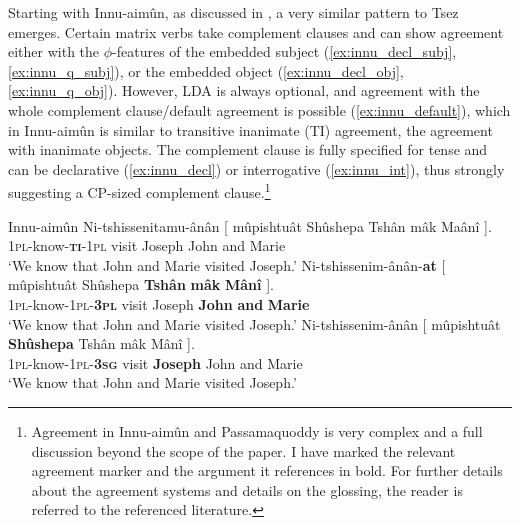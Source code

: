 \documentclass[output=paper
,modfonts
,nonflat]{langsci/langscibook}
\begin{document}
Starting with Innu-aim\^{u}n, as discussed in \citet{Branigan_MacKenzie2002}, a very similar pattern to Tsez emerges. Certain matrix verbs take complement clauses and can show agreement either with the $ \phi $-features of the embedded subject (\ref{ex:innu_decl_subj}, \ref{ex:innu_q_subj}), or the embedded object (\ref{ex:innu_decl_obj}, \ref{ex:innu_q_obj}). However, LDA is always optional, and agreement with the whole complement clause/default agreement is possible (\ref{ex:innu_default}), which in Innu-aim\^{u}n is similar to transitive inanimate (TI) agreement, the agreement with inanimate objects. The complement clause is fully specified for tense and can be declarative (\ref{ex:innu_decl}) or interrogative (\ref{ex:innu_int}), thus strongly suggesting a CP-sized complement clause.{\footnote{Agreement in Innu-aim\^{u}n and Passamaquoddy is very complex and a full discussion beyond the scope of the paper. I have marked the relevant agreement marker and the argument it references in bold. For further details about the agreement systems and details on the glossing, the reader is referred to the referenced literature.}} %
\begin{exe}
\ex Innu-aim\^{u}n \citep[][388]{Branigan_MacKenzie2002} \label{ex:innu_decl}
	\xlist
	\ex \label{ex:innu_default}
		\gll Ni-tshissenitamu-\^{a}n\^{a}n [ m\^{u}pishtu\^{a}t Sh\^{u}shepa Tsh\^{a}n m\^{a}k Ma\^{a}n\^{i} ].\\
			 \textsc{1pl}-know-\textsc{\textbf{ti}-1pl} {} visit Joseph John and Marie\\
		\glt `We know that John and Marie visited Joseph.'
	\ex \label{ex:innu_decl_subj}
		\gll Ni-tshissenim-\^{a}n\^{a}n-\textbf{at} [ m\^{u}pishtu\^{a}t Sh\^{u}shepa \textbf{Tsh\^{a}n} \textbf{m\^{a}k} \textbf{M\^{a}n\^{i}} ].\\
			 \textsc{1pl}-know-\textsc{1pl-\textbf{3pl}} {} visit Joseph \textbf{John} \textbf{and} \textbf{Marie}\\
		\glt `We know that John and Marie visited Joseph.'
	\ex \label{ex:innu_decl_obj}
		\gll Ni-tshissenim-\^{a}n\^{a}n [ m\^{u}pishtu\^{a}t \textbf{Sh\^{u}shepa} Tsh\^{a}n m\^{a}k M\^{a}n\^{i} ].\\
			 \textsc{1pl}-know-\textsc{1pl-\textbf{3sg}} {} visit \textbf{Joseph} John and Marie\\
		\glt `We know that John and Marie visited Joseph.'
	\endxlist
\end{exe}
\end{document}

